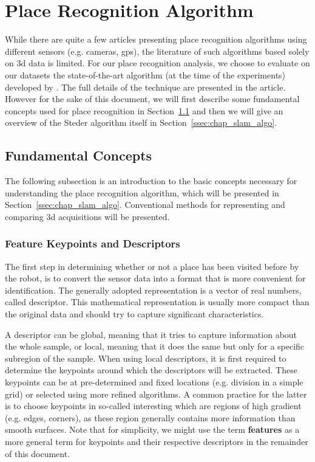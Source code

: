 \section{Place Recognition Algorithm}
\label{sec:chap_slam_algo}

While there are quite a few articles presenting place recognition algorithms using different sensors (e.g. cameras, \gls*{gps}), the literature of such algorithms based solely on \gls*{3d} data is limited. For our place recognition analysis, we choose to evaluate on our datasets the state-of-the-art algorithm (at the time of the experiments) developed by \citet{Steder2011b}. The full details of the technique are presented in the article. However for the sake of this document, we will first describe some fundamental concepts used for place recognition in Section~\ref{ssec:chap_slam_basics} and then we will give an overview of the Steder algorithm itself in Section~\ref{ssec:chap_slam_algo}.


\subsection{Fundamental Concepts}
\label{ssec:chap_slam_basics}

The following subsection is an introduction to the basic concepts necessary for understanding the place recognition algorithm, which will be presented in Section~\ref{ssec:chap_slam_algo}. Conventional methods for representing and comparing \gls*{3d} acquisitions will be presented. 

\subsubsection{Feature Keypoints and Descriptors}
\label{ssub:feature_keypoints_and_descriptors}

The first step in determining whether or not a place has been visited before by the robot, is to convert the sensor data into a format that is more convenient for identification. The generally adopted representation is a vector of real numbers, called descriptor. This mathematical representation is usually more compact than the original data and should try to capture significant characteristics.

A descriptor can be global, meaning that it tries to capture information about the whole sample, or local, meaning that it does the same but only for a specific subregion of the sample. When using local descriptors, it is first required to determine the keypoints around which the descriptors will be extracted. These keypoints can be at pre-determined and fixed locations (e.g. division in a simple grid) or selected using more refined algorithms. A common practice for the latter is to choose keypoints in so-called interesting which are regions of high gradient (e.g. edges, corners), as these region generally contains more information than smooth surfaces. Note that for simplicity, we might use the term \textbf{features} as a more general term for keypoints and their respective descriptors in the remainder of this document.

